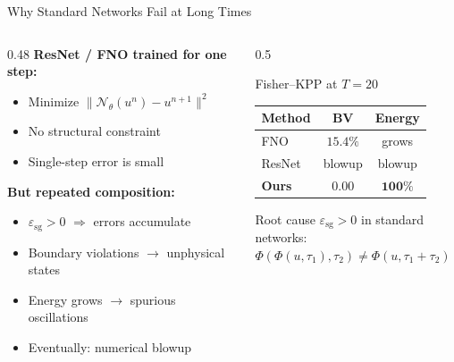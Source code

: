 \documentclass[aspectratio=169, 11pt]{beamer}
\begin{document}
\begin{frame}{Why Standard Networks Fail at Long Times}

\begin{columns}[T]
\begin{column}{0.48\textwidth}
\textbf{ResNet / FNO trained for one step:}
\begin{itemize}
    \item Minimize $\|\mathcal{N}_\theta(u^n) - u^{n+1}\|^2$
    \item No structural constraint
    \item Single-step error is small
\end{itemize}

\vspace{0.2cm}
\textbf{But repeated composition:}
\begin{itemize}
    \item $\varepsilon_{\mathrm{sg}} > 0$ $\Rightarrow$ errors \alert{accumulate}
    \item Boundary violations $\to$ unphysical states
    \item Energy grows $\to$ spurious oscillations
    \item Eventually: \alert{numerical blowup}
\end{itemize}
\end{column}

\begin{column}{0.5\textwidth}
\begin{exampleblock}{Fisher--KPP at $T=20$}
\begin{center}
\small
\renewcommand{\arraystretch}{1.15}
\begin{tabular}{lcc}
\toprule
Method & BV & Energy \\
\midrule
FNO & $15.4\%$ & grows \\
ResNet & blowup & blowup \\
\textbf{Ours} & $\mathbf{0.00}$ & $\mathbf{100\%}$ \\
\bottomrule
\end{tabular}
\end{center}
\end{exampleblock}

\vspace{0.15cm}
\begin{alertblock}{Root cause}
$\varepsilon_{\mathrm{sg}} > 0$ in standard networks:\\
\centering $\Phi(\Phi(u,\tau_1),\tau_2) \neq \Phi(u,\tau_1{+}\tau_2)$
\end{alertblock}
\end{column}
\end{columns}
\end{frame}
\end{document}
